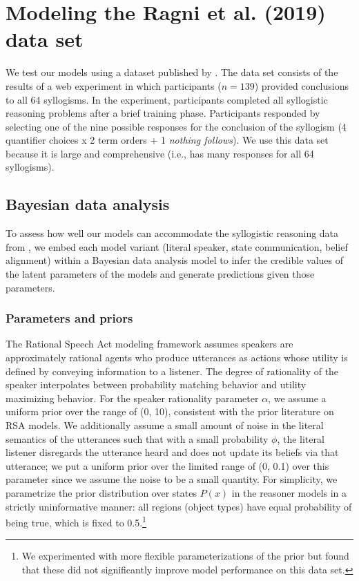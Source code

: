 \documentclass[floatsintext, man]{apa6}
\begin{document}
\section{Modeling the Ragni et al. (2019) data set}

We test our models using a dataset published by . 
The data set consists of the results of a web experiment in which participants ($n = 139$) provided conclusions to all 64 syllogisms. In the experiment, participants completed all syllogistic reasoning problems after a brief training phase. Participants responded by selecting one of the nine possible responses for the conclusion of the syllogism (4 quantifier choices x 2 term orders + 1 \emph{nothing follows}). 
We use this data set because it is large and comprehensive (i.e., has many responses for all 64 syllogisms). 




\subsection{Bayesian data analysis}

To assess how well our models can accommodate the syllogistic reasoning data from , we embed each model variant (literal speaker, state communication, belief alignment) within a Bayesian data analysis model to infer the credible values of the latent parameters of the models and generate predictions given those parameters. 

\subsubsection{Parameters and priors}

The Rational Speech Act modeling framework assumes speakers are approximately rational agents who produce utterances as actions whose utility is defined by conveying information to a listener. The degree of rationality of the speaker interpolates between probability matching behavior and utility maximizing behavior. 
For the speaker rationality parameter $\alpha$, we assume a uniform prior over the range of (0, 10), consistent with the prior literature on RSA models. 
We additionally assume a small amount of noise in the literal semantics of the utterances such that with a small probability $\phi$, the literal listener disregards the utterance heard and does not update its beliefs via that utterance; we put a uniform prior over the limited range of (0, 0.1) over this parameter since we assume the noise to be a small quantity. 
For simplicity, we parametrize the prior distribution over states $P(x)$ in the reasoner models in a strictly uninformative manner: all regions (object types) have equal probability of being true, which is fixed to 0.5.\footnote{
We experimented with more flexible parameterizations of the prior but found that these did not significantly improve model performance on this data set.}
\end{document}

